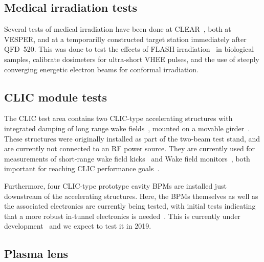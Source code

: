 \documentclass[a4paper,
               keeplastbox,   %
               ]{jacow}
\begin{document}
\subsection{Medical irradiation tests}
Several tests of medical irradiation have been done at CLEAR~\cite{Wilfrid::CLEARrev}, both at VESPER, and at a temporarilly constructed target station immediately after QFD~520.
This was done to test the effects of FLASH irradiation~\cite{FLASH2017} in biological samples, calibrate dosimeters for ultra-short VHEE pulses, and the use of steeply converging energetic electron beams for conformal irradiation.

\subsection{CLIC module tests}
The CLIC test area contains two CLIC-type accelerating structures with integrated damping of long range wake fields~\cite{Grudiev:TD26}, mounted on a movable girder~\cite{Durand-mover::AccelAlign12,Sosin-mover::IPAC12}.
These structures were originally installed as part of the two-beam test stand, and are currently not connected to an RF power source.
They are currently used for measurements of short-range wake field kicks~\cite{Antonio::IEEE-Kicks} and Wake field monitors~\cite{KyrreSjobak::CLICWS19}, both important for reaching CLIC performance goals~\cite{CLIC-CDR,CLIC-PIP}.


Furthermore, four CLIC-type prototype cavity BPMs are installed just downstream of the accelerating structures.
Here, the BPMs themselves as well as the associated electronics are currently being tested, with initial tests indicating that a more robust in-tunnel electronics is needed~\cite{NadenauThesis}.
This is currently under development~\cite{AlexejLyapin::CLICWS19} and we expect to test it in 2019.

\subsection{Plasma lens}
\end{document}
